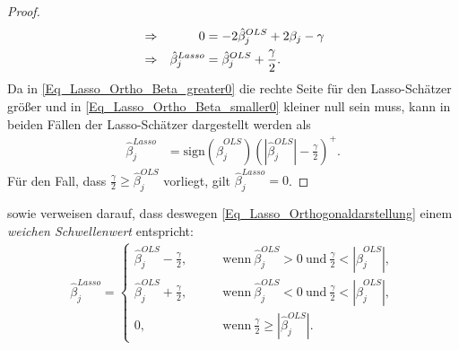 \documentclass[12pt, a4paper]{report}\usepackage[]{graphicx}\usepackage[]{color}
\begin{document}
\begin{appendix}
\begin{proof}
\begin{align}
&\Rightarrow& 0&=-2\hat{\beta}_j^{OLS} + 2\beta_j - \gamma \notag \\
&\Rightarrow& \hat{\beta}_j^{Lasso}&=\hat{\beta}_j^{OLS}+\frac{\gamma}{2} .
\end{align}
Da in \eqref{Eq_Lasso_Ortho_Beta_greater0} die rechte Seite für den Lasso-Schätzer größer und in \eqref{Eq_Lasso_Ortho_Beta_smaller0} kleiner null sein muss, kann in beiden Fällen der Lasso-Schätzer dargestellt werden als
\begin{align}\label{Eq_Lasso_Orthogonaldarstellung}
\hat{\beta}_j^{Lasso}&=\text{sign}(\hat{\beta}_j^{OLS})(|\hat{\beta}_j^{OLS}|-\frac{\gamma}{2})^+ . 
\end{align}
Für den Fall, dass $\frac{\gamma}{2} \geq \hat{\beta}_j^{OLS}$ vorliegt, gilt $\hat{\beta}_j^{Lasso}=0$.
\end{proof}

 sowie  verweisen darauf, dass deswegen \eqref{Eq_Lasso_Orthogonaldarstellung} einem \textit{weichen Schwellenwert} entspricht:
\begin{align*}
\hat{\beta}_j^{Lasso} =
\begin{cases}
\hat{\beta}_j^{OLS}-\frac{\gamma}{2}, \qquad &\text{wenn} \ \hat{\beta}_j^{OLS} > 0 \ \text{und} \ \frac{\gamma}{2} < |\hat{\beta}_j^{OLS}| ,\\
\hat{\beta}_j^{OLS}+\frac{\gamma}{2}, \qquad &\text{wenn} \ \hat{\beta}_j^{OLS} < 0 \ \text{und} \ \frac{\gamma}{2} < |\hat{\beta}_j^{OLS}| ,\\
0, \qquad &\text{wenn} \ \frac{\gamma}{2} \geq |\hat{\beta}_j^{OLS}|. 
\end{cases}
\end{align*}






\end{appendix}
\end{document}
